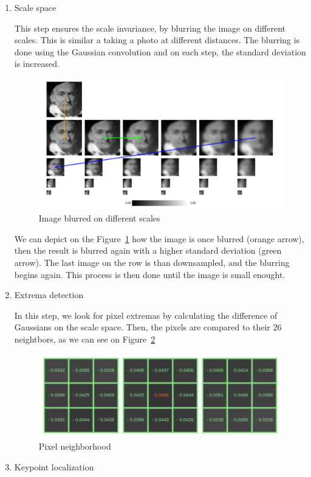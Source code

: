 \documentclass{scrartcl}
\begin{document}
\begin{enumerate}
    \item Scale space

        This step ensures the scale invariance, by blurring the image on different scales. This is similar a taking a photo at different distances. The blurring is done using the Gaussian convolution and on each step, the standard deviation is increased.

        \begin{figure}[H]
            \centering
            \includegraphics[width=0.6\linewidth]{img/sift1}
            \caption{Image blurred on different scales}%
            \label{fig:sift1}
        \end{figure}

        We can depict on the Figure~\ref{fig:sift1} how the image is once blurred (orange arrow), then the result is blurred again with a higher standard deviation (green arrow). The last image on the row is than downsampled, and the blurring begins again. This process is then done until the image is small enought.

    \item Extrema detection

        In this step, we look for pixel extremas by calculating the difference of Gaussians on the scale space. Then, the pixels are compared to their 26 neightbors, as we can see on Figure~\ref{fig:sift2}

        \begin{figure}[H]
            \centering
            \includegraphics[width=0.5\linewidth]{img/sift2}
            \caption{Pixel neighborhood}%
            \label{fig:sift2}
        \end{figure}

    \item Keypoint localization


\end{enumerate}
\end{document}
